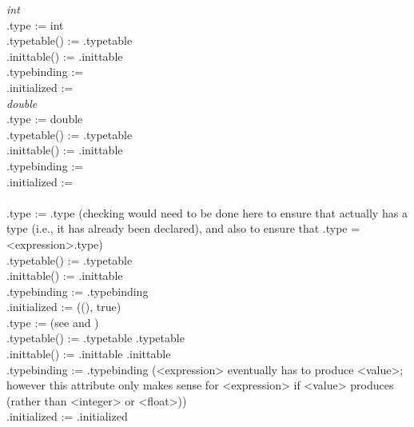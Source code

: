 \documentclass{article}
\begin{document}
\begin{enumerate}
{\it {} \rarrow int}\\
.type := int\\
.typetable() := .typetable\\
.inittable() := .inittable\\
.typebinding := \na\\
.initialized := \na\\

{\it {} \rarrow double}\\
.type := double\\
.typetable() := .typetable\\
.inittable() := .inittable\\
.typebinding := \na\\
.initialized := \na\\

{\it {} \rarrow {} }\\
.type := .type 
(checking would need to be done here to ensure that 
 actually has a type (i.e., it has already been declared), 
and also to ensure that .type = <expression>.type)
\\
.typetable() := .typetable\\
.inittable() := .inittable\\
.typebinding := .typebinding\\
.initialized := ((), true)\\

.type := (see  and )\\
.typetable() := .typetable \union {}.typetable\\
.inittable() := .inittable \union {}.inittable\\
.typebinding := .typebinding 
(<expression> eventually has to produce <value>; 
however this attribute only makes sense for <expression> 
if <value> produces  (rather than <integer> or <float>))\\
.initialized := .initialized\\


\end{enumerate}
\end{document}
